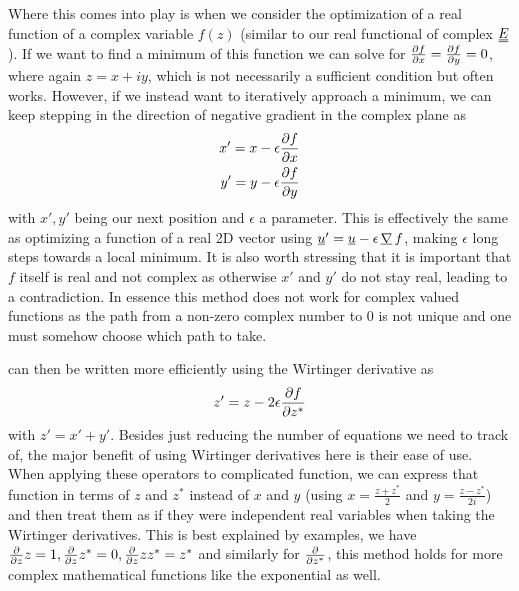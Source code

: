 \documentclass[12pt]{article}
\newcommand{\suf}[2]{\stackunder[0.5pt]{\stackunder[1pt]{\ensuremath{#1}}{\rule{\widthof{\ensuremath{#2}}*\real{0.9}}{.1ex}}}{}}
\newcommand{\duf}[2]{\stackunder[0.5pt]{\stackunder[0.8pt]{\stackunder[1pt]{\ensuremath{#1}}{\rule{\widthof{\ensuremath{#2}}*\real{0.9}}{.1ex}}}{\rule{\widthof{\ensuremath{#2}}*\real{0.9}}{.1ex}}}{}}
\newcommand{\su}[1]{\suf{#1}{#1}}
\newcommand{\du}[1]{\duf{#1}{#1}}
\newcommand{\mgrad}{\ensuremath{\suf{\nabla}{K}\,}}
\newcommand{\EE}{\ensuremath{\du{E}}}
\begin{document}
        Where this comes into play is when we consider the optimization of a real function of a complex variable $f(z)$ (similar to our real functional of complex \EE).
        If we want to find a minimum of this function we can solve for $\pdv{f}{x} = \pdv{f}{y} = 0$, where again $z=x+iy$, which is not necessarily a sufficient condition but often works.
        However, if we instead want to iteratively approach a minimum, we can keep stepping in the direction of negative gradient in the complex plane as
        \begin{align}
            x' = x - \epsilon\pdv{f}{x}\label{eq:random1} \\
            y' = y - \epsilon\pdv{f}{y}\label{eq:random2}
        \end{align}
        with $x', y'$ being our next position and $\epsilon$ a parameter.
        This is effectively the same as optimizing a function of a real 2D vector using $\su{u}' = \su{u} - \epsilon \, \mgrad f$, making $\epsilon$ long steps towards a local minimum.
        It is also worth stressing that it is important that $f$ itself is real and not complex as otherwise $x'$ and $y'$ do not stay real, leading to a contradiction.
        In essence this method does not work for complex valued functions as the path from a non-zero complex number to 0 is not unique and one must somehow choose which path to take.

         can then be written more efficiently using the Wirtinger derivative as
        \begin{equation}
            z' = z - 2\epsilon \pdv{f}{z^*}
        \end{equation}
        with $z' = x' + y'$.
        Besides just reducing the number of equations we need to track of, the major benefit of using Wirtinger derivatives here is their ease of use.
        When applying these operators to complicated function, we can express that function in terms of $z$ and $z^*$ instead of $x$ and $y$ (using $x = \frac{z+z^*}{2}$ and $y = \frac{z-z^*}{2i}$) and then treat them as if they were independent real variables when taking the Wirtinger derivatives.
        This is best explained by examples, we have $\pdv{z} z = 1, \pdv{z} z^* = 0, \pdv{z} z z^* = z^*$ and similarly for $\pdv{z^*}$, this method holds for more complex mathematical functions like the exponential as well\cite{haslingerComplexAnalysisFunctional2017}.
\end{document}

